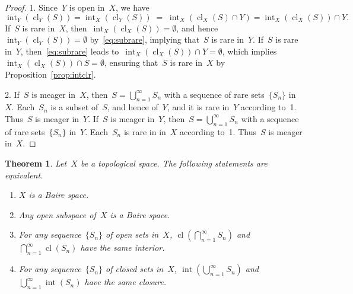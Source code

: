 \documentclass[11pt,a4paper]{article}
\newtheorem{theorem}{Theorem}[section]
\theoremstyle{definition}
\DeclareMathOperator{\inter}{int}
\DeclareMathOperator{\cl}{cl}
\numberwithin{equation}{section}
\begin{document}
\begin{proof} 
  1. Since~$Y$ is open in~$X$, we have
 \begin{equation}
   \label{eq:subrare}
     \inter_Y(\cl_Y(S)) = \inter_X(\cl_Y(S)) \;=\; \inter_X(\cl_X(S)\cap Y) = \inter_X(\cl_X(S))\cap Y.
 \end{equation}
   If~$S$ is rare in~$X$, then~$\inter_X(\cl_X(S))=\emptyset$, and hence~$\inter_Y(\cl_Y(S))
   = \emptyset$ by~\eqref{eq:subrare}, 
   implying that~$S$ is rare in~$Y$. 
   If~$S$ is rare in~$Y$, then~\eqref{eq:subrare} leads
   to~$\inter_{X}(\cl_X(S))\cap Y = \emptyset$, which implies~$\inter_X(\cl_X(S))\cap
   S = \emptyset$,  ensuring that~$S$ is rare in~$X$ by Proposition~\ref{prop:intclr}.

   2. If~$S$ is meager in~$X$, then~$S= \bigcup_{n=1}^\infty S_n$ with a sequence of rare
   sets~$\{S_n\}$ in~$X$. Each~$S_n$ is a subset of~$S$, and hence of~$Y$, and it is rare
   in~$Y$ according to~1. Thus~$S$ is meager in~$Y$. If~$S$ is meager in~$Y$, then~$S
   = \bigcup_{n=1}^\infty S_n$ with a sequence of rare sets~$\{S_n\}$ in~$Y$. Each~$S_n$ is rare in
   in~$X$ according to~1. Thus~$S$ is meager in~$X$. 
\end{proof}


\begin{theorem}
  \label{th:intcl}
   Let~$X$ be a topological space. The following statements are equivalent.  
   \begin{enumerate}
     \item $X$ is a Baire space.
     \item Any open subspace of~$X$ is a Baire space. 
     \item For any sequence~$\{S_n\}$ of open sets in~$X$, $\cl(\bigcap_{n=1}^\infty S_n)$ and
       $\bigcap_{n=1}^\infty \cl(S_n)$ have the same interior. 
     \item For any sequence~$\{S_n\}$ of closed sets in~$X$, $\inter(\bigcup_{n=1}^\infty S_n)$ and
       $\bigcup_{n=1}^\infty \inter(S_n)$ have the same closure. 
   \end{enumerate}
\end{theorem}
\end{document}
